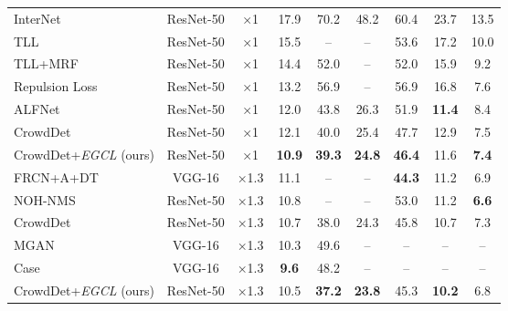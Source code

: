 \documentclass[journal]{IEEEtran}
\begin{document}
\begin{table*}[!t]
\begin{tabular}{l| c c c c c c c c}
\midrule
InterNet~\cite{li2019feature}& ResNet-50&×1& 17.9&70.2 & 48.2& 60.4 & 23.7& 13.5
 \\
TLL~\cite{song2018small} & ResNet-50        & ×1          &  15.5                                &    --                          &   --      & 53.6 &17.2 &  10.0                            \\ 
TLL+MRF~\cite{song2018small} &  ResNet-50    & ×1          &  14.4                               &      52.0                         &  -- & 52.0 & 15.9 & 9.2                               \\
Repulsion Loss~\cite{wang2018repulsion}  &  ResNet-50  & ×1          &     13.2                            &      56.9                           &   --   & 56.9 & 16.8 & 7.6                                 \\ 
ALFNet~\cite{liu2018learning} &  ResNet-50        & ×1      &    12.0        &    43.8      &  26.3     & 51.9 & \textbf{11.4} &    8.4                             \\ 
CrowdDet~\cite{chu2020detection} & ResNet-50  & ×1        & 12.1                                &  40.0                                &  25.4     & 47.7 & 12.9 &  7.5 \\
CrowdDet+\emph{EGCL} (ours) & ResNet-50  & ×1        & \textbf{10.9}                                 &  \textbf{39.3}                              &   \textbf{24.8}    & \textbf{46.4} & 11.6 &  \textbf{7.4}  \\
\midrule
FRCN+A+DT~\cite{zhou2019discriminative}&VGG-16& ×1.3& 11.1& --& --&\textbf{44.3} & 11.2 & 6.9 \\
NOH-NMS~\cite{zhou2020noh} & ResNet-50 & ×1.3 &10.8&--&--&53.0&11.2&\textbf{6.6} \\
CrowdDet~\cite{chu2020detection} & ResNet-50 & ×1.3 &10.7&38.0&24.3&45.8&10.7&7.3 \\
MGAN~\cite{pang2019mask}& VGG-16& ×1.3& 10.3 & 49.6 & -- & -- & -- & --\\
Case~\cite{xie2020count} & VGG-16   & ×1.3        &   \textbf{9.6}        &        48.2      &  --      & -- &-- & -- \\
CrowdDet+\emph{EGCL} (ours) & ResNet-50 & ×1.3 & 10.5&\textbf{37.2}&\textbf{23.8}&45.3&\textbf{10.2}&6.8\\
\bottomrule
\end{tabular}
\label{tab:comparison_city}
\end{table*}
\end{document}
